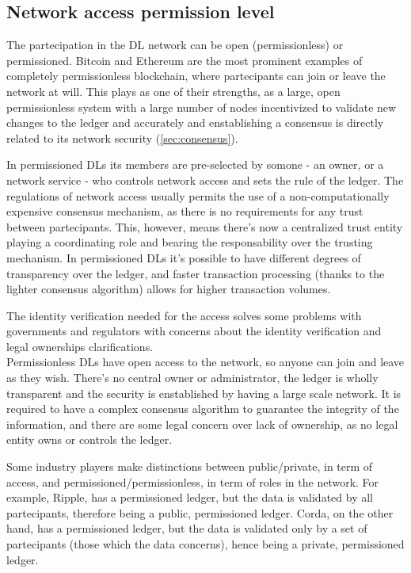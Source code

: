 \subsection{Network access permission level}

The partecipation in the DL network can be open (permissionless) or permissioned. Bitcoin and Ethereum are the most prominent examples of completely permissionless blockchain, where partecipants can join or leave the network at will. This plays as one of their strengths, as a large, open permissionless system with a large number of nodes incentivized to validate new changes to the ledger and accurately and enstablishing a consensus is directly related to its network security (\ref{sec:consensus}).

In permissioned DLs its members are pre-selected by somone - an owner, or a network service - who controls network access and sets the rule of the ledger. The regulations of network access usually permits the use of a non-computationally expensive consensus mechanism, as there is no requirements for any trust between partecipants. This, however, means there's now a centralized trust entity playing a coordinating role and bearing the responsability over the trusting mechanism. 
In permissioned DLs it's possible to have different degrees of transparency over the ledger, and faster transaction processing (thanks to the lighter consensus algorithm) allows for higher transaction volumes.

The identity verification needed for the access solves some problems with governments and regulators with concerns about the identity verification and legal ownerships clarifications. \\

Permissionless DLs have open access to the network, so anyone can join and leave as they wish. There's no central owner or administrator, the ledger is wholly transparent and the security is enstablished by having a large scale network. It is required to have a complex consensus algorithm to guarantee the integrity of the information, and there are some legal concern over lack of ownership, as no legal entity owns or controls the ledger.

Some industry players make distinctions between public/private, in term of access, and permissioned/permissionless, in term of roles in the network. For example, Ripple, has a permissioned ledger, but the data is validated by all partecipants, therefore being a public, permissioned ledger. Corda, on the other hand, has a permissioned ledger, but the data is validated only by a set of partecipants (those which the data concerns), hence being a private, permissioned ledger.

